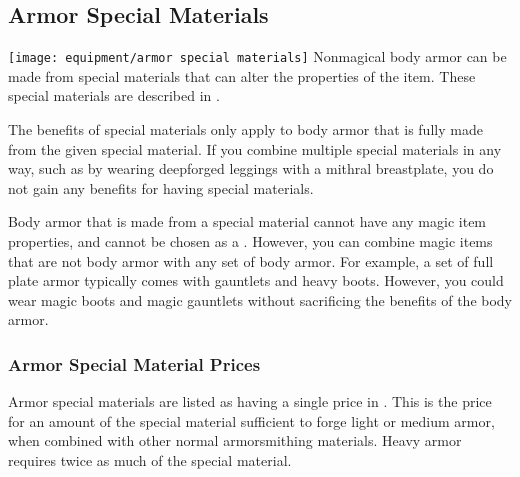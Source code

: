   \subsection{Armor Special Materials}\label{Armor Special Materials}
    \texttt{[image: equipment/armor special materials]}
    Nonmagical body armor can be made from special materials that can alter the properties of the item.
    These special materials are described in .

    The benefits of special materials only apply to body armor that is fully made from the given special material.
    If you combine multiple special materials in any way, such as by wearing deepforged leggings with a mithral breastplate, you do not gain any benefits for having special materials.

    Body armor that is made from a special material cannot have any magic item properties, and cannot be chosen as a .
    However, you can combine magic items that are not body armor with any set of body armor.
    For example, a set of full plate armor typically comes with gauntlets and heavy boots.
    However, you could wear magic boots and magic gauntlets without sacrificing the benefits of the body armor.

    \subsubsection{Armor Special Material Prices}
      Armor special materials are listed as having a single price in .
      This is the price for an amount of the special material sufficient to forge light or medium armor, when combined with other normal armorsmithing materials.
      Heavy armor requires twice as much of the special material.

